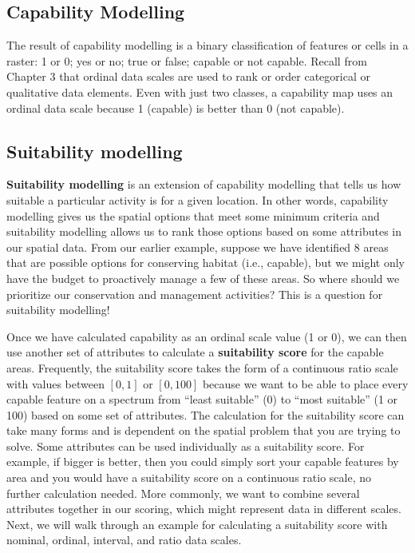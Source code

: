 \documentclass[
]{book}
\begin{document}
\hypertarget{capability-modelling}{%
\subsection{Capability Modelling}\label{capability-modelling}}

The result of capability modelling is a binary classification of features or cells in a raster: 1 or 0; yes or no; true or false; capable or not capable. Recall from Chapter 3 that ordinal data scales are used to rank or order categorical or qualitative data elements. Even with just two classes, a capability map uses an ordinal data scale because 1 (capable) is better than 0 (not capable).

\hypertarget{suitability-modelling}{%
\subsection{Suitability modelling}\label{suitability-modelling}}

\textbf{Suitability modelling} is an extension of capability modelling that tells us how suitable a particular activity is for a given location. In other words, capability modelling gives us the spatial options that meet some minimum criteria and suitability modelling allows us to rank those options based on some attributes in our spatial data. From our earlier example, suppose we have identified 8 areas that are possible options for conserving habitat (i.e., capable), but we might only have the budget to proactively manage a few of these areas. So where should we prioritize our conservation and management activities? This is a question for suitability modelling!

Once we have calculated capability as an ordinal scale value (1 or 0), we can then use another set of attributes to calculate a \textbf{suitability score} for the capable areas. Frequently, the suitability score takes the form of a continuous ratio scale with values between \([0,1]\) or \([0,100]\) because we want to be able to place every capable feature on a spectrum from ``least suitable'' (0) to ``most suitable'' (1 or 100) based on some set of attributes. The calculation for the suitability score can take many forms and is dependent on the spatial problem that you are trying to solve. Some attributes can be used individually as a suitability score. For example, if bigger is better, then you could simply sort your capable features by area and you would have a suitability score on a continuous ratio scale, no further calculation needed. More commonly, we want to combine several attributes together in our scoring, which might represent data in different scales. Next, we will walk through an example for calculating a suitability score with nominal, ordinal, interval, and ratio data scales.
\end{document}

